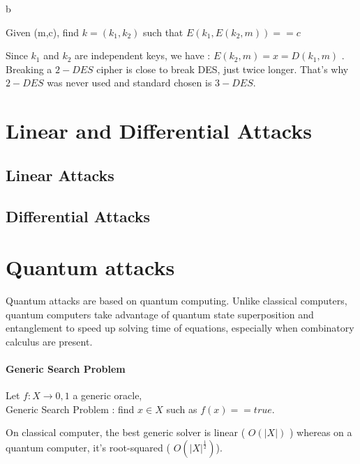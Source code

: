 \begin{mydef}[Challenge :]
b \newline
\begin{minipage}[t]{0.9\textwidth}
	Given (m,c), find $k = (k_1,k_2)$ such that $E(k_1,E(k_2,m)) == c$
\end{minipage}
\end{mydef}

Since $k_1$ and $k_2$ are independent keys, we have : $E(k_2,m) = x = D(k_1,m) $ . Breaking a $2-DES$ cipher is close to break DES, just twice longer. That's why $2-DES$ was never used and standard chosen is $3-DES$.

\section{Linear and Differential Attacks}

\subsection{Linear Attacks}
\subsection{Differential Attacks}


\section{Quantum attacks}

Quantum attacks are based on quantum computing. Unlike classical computers, quantum computers take advantage of quantum state superposition and entanglement to speed up solving time of equations, especially when combinatory calculus are present.

\paragraph{ Generic Search Problem}

\begin{mydef}
\begin{minipage}[t]{0.8\textwidth}
    Let $f : X \rightarrow {0,1}$ a generic oracle, \\
  	Generic Search Problem : find $x \in X$ such as $ f(x) == true $.
\end{minipage}
\end{mydef}

On classical computer, the best generic solver is linear ( $O(|X|)$ ) whereas on a quantum computer, it's root-squared ( $O(|X|^{\frac{1}{2}})$).


